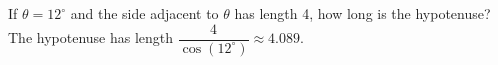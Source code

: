 {If $\theta = 12^{\circ}$ and the side adjacent to $\theta$ has length 4, how long is the hypotenuse?}
{The hypotenuse has length $\dfrac{4}{\cos(12^{\circ})}\approx 4.089$.}
